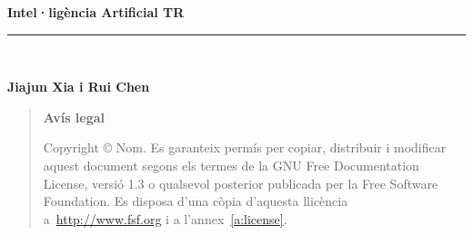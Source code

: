 \newlength{\centeroffset}
\setlength{\centeroffset}{-0.5\oddsidemargin}
\addtolength{\centeroffset}{0.5\evensidemargin}
\thispagestyle{empty}
\noindent\hspace*{\centeroffset}\begin{minipage}{\textwidth}
\vspace*{3truecm}

\flushright
{\Huge\bfseries 
  Intel·ligència Artificial TR
}
\noindent\rule[-1ex]{\textwidth}{5pt}\\[4.5ex]
\end{minipage}

\noindent\hspace*{\centeroffset}\begin{minipage}{\textwidth}
\flushright
{\bfseries 
	Jiajun Xia i Rui Chen
}
\end{minipage}


\pagebreak

\vspace*{16truecm}

	\begin{quote}
	\textbf{Avís legal}

	  Copyright \copyright{}  Nom.
	  Es garanteix permís per copiar, distribuir i modificar aquest document segons els termes de la GNU Free Documentation License, versió 1.3 o qualsevol posterior publicada per la Free Software Foundation. Es disposa d'una còpia d'aquesta llicència a~\href{http://www.fsf.org}{http://www.fsf.org} i a l'annex~\ref{a:license}.
	\end{quote}	





\endinput
